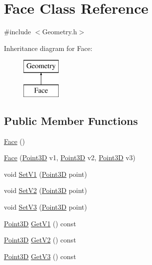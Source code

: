 \hypertarget{class_face}{}\section{Face Class Reference}
\label{class_face}


{\ttfamily \#include $<$Geometry.\+h$>$}

Inheritance diagram for Face\+:\begin{figure}[H]
\begin{center}
\leavevmode
\includegraphics[height=2.000000cm]{class_face}
\end{center}
\end{figure}
\subsection*{Public Member Functions}
\begin{DoxyCompactItemize}
\item 
\hyperlink{class_face_afdb634bc2d5287ba0d62e46b57e9dc2e}{Face} ()
\item 
\hyperlink{class_face_aaf867e5f898344930188a82a566b1a55}{Face} (\hyperlink{class_point3_d}{Point3D} v1, \hyperlink{class_point3_d}{Point3D} v2, \hyperlink{class_point3_d}{Point3D} v3)
\item 
void \hyperlink{class_face_a0aa6787b68f53915e9638eff3b32f6db}{Set\+V1} (\hyperlink{class_point3_d}{Point3D} point)
\item 
void \hyperlink{class_face_ad4cd189f6de7169d1b7d256fc76836e7}{Set\+V2} (\hyperlink{class_point3_d}{Point3D} point)
\item 
void \hyperlink{class_face_a81311d36d3f1bb6f7b92629c327a06aa}{Set\+V3} (\hyperlink{class_point3_d}{Point3D} point)
\item 
\hyperlink{class_point3_d}{Point3D} \hyperlink{class_face_ae6df8ea5ce4f2b7b6a5ad1dcc6fb4d07}{Get\+V1} () const
\item 
\hyperlink{class_point3_d}{Point3D} \hyperlink{class_face_a8ce9ccf7617c5d7224d885c08cf8651e}{Get\+V2} () const
\item 
\hyperlink{class_point3_d}{Point3D} \hyperlink{class_face_a8aaddb9ebb59e71a21df96e6d38fe29d}{Get\+V3} () const
\end{DoxyCompactItemize}


